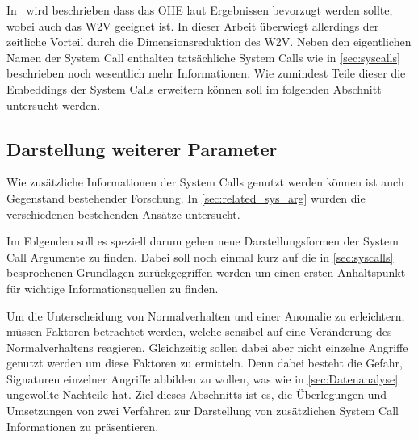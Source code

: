             In~\cite{W2VWUNDERLICH2019} wird beschrieben dass das \ac{OHE} laut Ergebnissen bevorzugt werden sollte, wobei auch das \ac{W2V} geeignet ist.
            In dieser Arbeit überwiegt allerdings der zeitliche Vorteil durch die Dimensionsreduktion des \ac{W2V}.
            Neben den eigentlichen Namen der System Call enthalten tatsächliche System Calls wie in \autoref{sec:syscalls} beschrieben noch wesentlich mehr Informationen.
            Wie zumindest Teile dieser die Embeddings der System Calls erweitern können soll im folgenden Abschnitt untersucht werden.

        \subsection{Darstellung weiterer Parameter}\label{sec:Meta}
                Wie zusätzliche Informationen der System Calls genutzt werden können ist auch Gegenstand bestehender Forschung.
                In \autoref{sec:related_sys_arg} wurden die verschiedenen bestehenden Ansätze untersucht.

                Im Folgenden soll es speziell darum gehen neue Darstellungsformen der System Call Argumente zu finden.
                Dabei soll noch einmal kurz auf die in \autoref{sec:syscalls} besprochenen Grundlagen zurückgegriffen werden um einen ersten Anhaltspunkt für wichtige Informationsquellen zu finden.

                Um die Unterscheidung von Normalverhalten und einer Anomalie zu erleichtern, müssen Faktoren betrachtet werden, welche sensibel auf eine Veränderung des Normalverhaltens reagieren.
                Gleichzeitig sollen dabei aber nicht einzelne Angriffe genutzt werden um diese Faktoren zu ermitteln.
                Denn dabei besteht die Gefahr, Signaturen einzelner Angriffe abbilden zu wollen, was wie in \autoref{sec:Datenanalyse} ungewollte Nachteile hat.
                Ziel dieses Abschnitts ist es, die Überlegungen und Umsetzungen von zwei Verfahren zur Darstellung von zusätzlichen System Call Informationen zu präsentieren.

